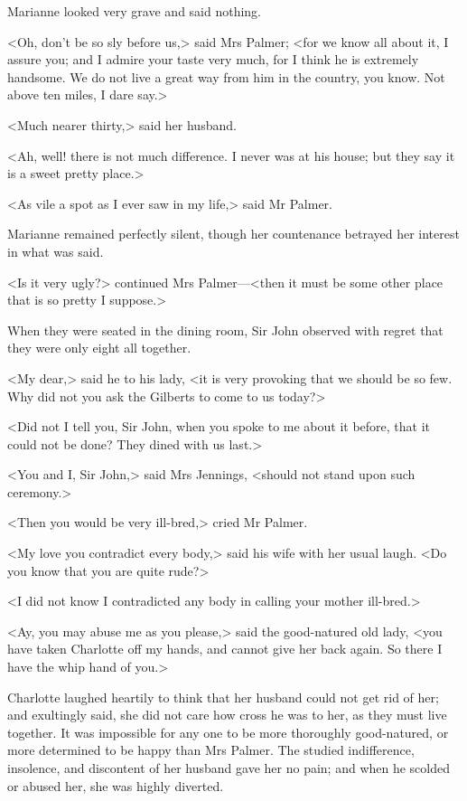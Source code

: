 Marianne looked very grave and said nothing.

<Oh, don't be so sly before us,> said Mrs Palmer; <for we know all about it, I assure you; and I admire your taste very much, for I think he is extremely handsome. We do not live a great way from him in the country, you know. Not above ten miles, I dare say.>

<Much nearer thirty,> said her husband.

<Ah, well! there is not much difference. I never was at his house; but they say it is a sweet pretty place.>

<As vile a spot as I ever saw in my life,> said Mr Palmer.

Marianne remained perfectly silent, though her countenance betrayed her interest in what was said.

<Is it very ugly?> continued Mrs Palmer—<then it must be some other place that is so pretty I suppose.>

When they were seated in the dining room, Sir John observed with regret that they were only eight all together.

<My dear,> said he to his lady, <it is very provoking that we should be so few. Why did not you ask the Gilberts to come to us today?>

<Did not I tell you, Sir John, when you spoke to me about it before, that it could not be done? They dined with us last.>

<You and I, Sir John,> said Mrs Jennings, <should not stand upon such ceremony.>

<Then you would be very ill-bred,> cried Mr Palmer.

<My love you contradict every body,> said his wife with her usual laugh. <Do you know that you are quite rude?>

<I did not know I contradicted any body in calling your mother ill-bred.>

<Ay, you may abuse me as you please,> said the good-natured old lady, <you have taken Charlotte off my hands, and cannot give her back again. So there I have the whip hand of you.>

Charlotte laughed heartily to think that her husband could not get rid of her; and exultingly said, she did not care how cross he was to her, as they must live together. It was impossible for any one to be more thoroughly good-natured, or more determined to be happy than Mrs Palmer. The studied indifference, insolence, and discontent of her husband gave her no pain; and when he scolded or abused her, she was highly diverted.

